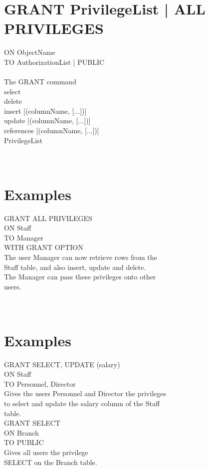 \documentclass[12pt]{article}
\begin{document}
\begin{itemize}
\begin{itemize}
\begin{itemize}
\begin{itemize}
\begin{itemize}
\section{GRANT {PrivilegeList | ALL PRIVILEGES}}
ON ObjectName\\ 
TO {AuthorizationList | PUBLIC}\\ 
[WITH GRANT OPTION]\\ 
The GRANT command\\ 
select\\ 
delete\\ 
insert [(columnName, [...])]\\ 
update [(columnName, [...])]\\ 
references [(columnName, [...])]\\ 
PrivilegeList\\ 
\\ 
 \\ 
\section{Examples}
GRANT ALL PRIVILEGES\\ 
ON Staff\\ 
TO Manager\\ 
WITH GRANT OPTION\\ 
The user Manager can now retrieve rows from the \\ 
Staff table, and also insert, update and delete.\\ 
The Manager can pass these privileges onto other \\ 
users.\\ 
\\ 
 \\ 
\section{Examples}
GRANT SELECT, UPDATE (salary)\\ 
ON Staff\\ 
TO Personnel, Director\\ 
Gives the users Personnel and Director the privileges \\ 
to select and update the salary column of the Staff \\ 
table.\\ 
GRANT SELECT\\ 
ON Branch\\ 
TO PUBLIC\\ 
Gives all users the privilege \\ 
SELECT on the Branch table.\\ 
\\ 
 \\ 

\end{itemize}
\end{itemize}
\end{itemize}
\end{itemize}
\end{itemize}
\end{document}
